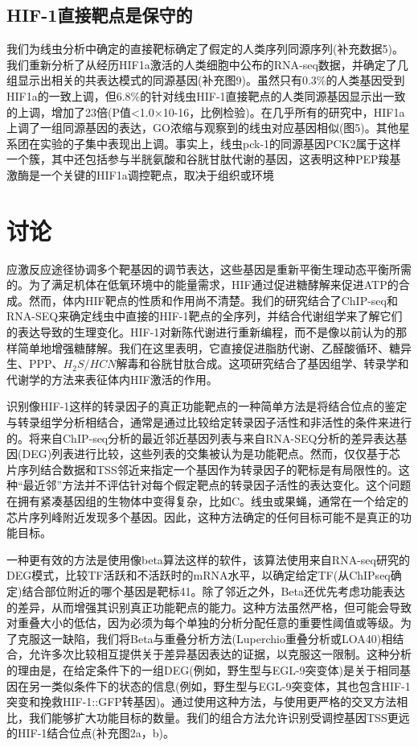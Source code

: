 \documentclass{ctexart}
\begin{document}
    \subsection{HIF-1直接靶点是保守的}

    我们为线虫分析中确定的直接靶标确定了假定的人类序列同源序列(补充数据5)。我们重新分析了从经历HIF1a激活的人类细胞中公布的RNA-seq数据，并确定了几组显示出相关的共表达模式的同源基因(补充图9)。虽然只有0.3\%的人类基因受到HIF1a的一致上调，但6.8\%的针对线虫HIF-1直接靶点的人类同源基因显示出一致的上调，增加了23倍(P值<1.0×10-16，比例检验)。在几乎所有的研究中，HIF1a上调了一组同源基因的表达，GO浓缩与观察到的线虫对应基因相似(图5)。其他星系团在实验的子集中表现出上调。事实上，线虫pck-1的同源基因PCK2属于这样一个簇，其中还包括参与半胱氨酸和谷胱甘肽代谢的基因，这表明这种PEP羧基激酶是一个关键的HIF1a调控靶点，取决于组织或环境

    \section{讨论}

    应激反应途径协调多个靶基因的调节表达，这些基因是重新平衡生理动态平衡所需的。为了满足机体在低氧环境中的能量需求，HIF通过促进糖酵解来促进ATP的合成。然而，体内HIF靶点的性质和作用尚不清楚。我们的研究结合了ChIP-seq和RNA-SEQ来确定线虫中直接的HIF-1靶点的全序列，并结合代谢组学来了解它们的表达导致的生理变化。HIF-1对新陈代谢进行重新编程，而不是像以前认为的那样简单地增强糖酵解。我们在这里表明，它直接促进脂肪代谢、乙醛酸循环、糖异生、PPP、$H_{2}S/HCN$解毒和谷胱甘肽合成。这项研究结合了基因组学、转录学和代谢学的方法来表征体内HIF激活的作用。

    识别像HIF-1这样的转录因子的真正功能靶点的一种简单方法是将结合位点的鉴定与转录组学分析相结合，通常是通过比较给定转录因子活性和非活性的条件来进行的。将来自ChIP-seq分析的最近邻近基因列表与来自RNA-SEQ分析的差异表达基因(DEG)列表进行比较，这些列表的交集被认为是功能靶点。然而，仅仅基于芯片序列结合数据和TSS邻近来指定一个基因作为转录因子的靶标是有局限性的。这种“最近邻”方法并不评估针对每个假定靶点的转录因子活性的表达变化。这个问题在拥有紧凑基因组的生物体中变得复杂，比如C。线虫或果蝇，通常在一个给定的芯片序列峰附近发现多个基因。因此，这种方法确定的任何目标可能不是真正的功能目标。

    一种更有效的方法是使用像beta算法这样的软件，该算法使用来自RNA-seq研究的DEG模式，比较TF活跃和不活跃时的mRNA水平，以确定给定TF(从ChIPseq确定)结合部位附近的哪个基因是靶标41。除了邻近之外，Beta还优先考虑功能表达的差异，从而增强其识别真正功能靶点的能力。这种方法虽然严格，但可能会导致对重叠大小的低估，因为必须为每个单独的分析分配任意的重要性阈值或等级。为了克服这一缺陷，我们将Beta与重叠分析方法(Luperchio重叠分析或LOA40)相结合，允许多次比较相互提供关于差异基因表达的证据，以克服这一限制。这种分析的理由是，在给定条件下的一组DEG(例如，野生型与EGL-9突变体)是关于相同基因在另一类似条件下的状态的信息(例如，野生型与EGL-9突变体，其也包含HIF-1突变和挽救HIF-1::GFP转基因)。通过使用这种方法，与使用更严格的交叉方法相比，我们能够扩大功能目标的数量。我们的组合方法允许识别受调控基因TSS更远的HIF-1结合位点(补充图2a，b)。
    
\end{document}
